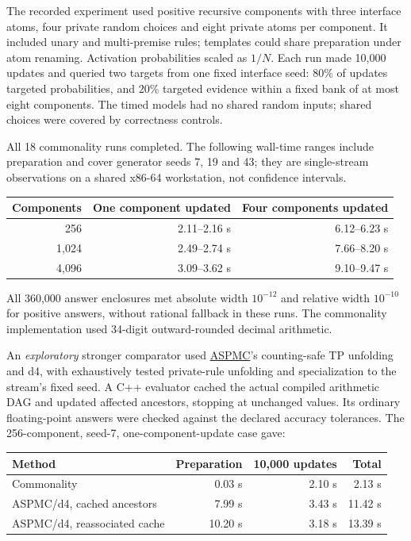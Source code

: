 \documentclass[11pt,a4paper]{article}
\begin{document}
The recorded experiment used positive recursive components with three interface
atoms, four private random choices and eight private atoms per component.
It included unary and multi-premise rules; templates could share preparation
under atom renaming. Activation probabilities scaled as $1/N$. Each run made
10,000 updates and queried two targets from one fixed interface seed: 80\% of
updates targeted probabilities, and 20\% targeted evidence within a fixed bank
of at most eight components. The timed models had no shared random inputs;
shared choices were covered by correctness controls.

All 18 commonality runs completed. The following wall-time ranges include
preparation and cover generator seeds 7, 19 and 43; they are single-stream
observations on a shared x86-64 workstation, not confidence intervals.

\begin{center}
\begin{tabular}{@{}rrr@{}}
\toprule
Components & One component updated & Four components updated \\
\midrule
256   & 2.11--2.16 s & 6.12--6.23 s \\
1,024 & 2.49--2.74 s & 7.66--8.20 s \\
4,096 & 3.09--3.62 s & 9.10--9.47 s \\
\bottomrule
\end{tabular}
\end{center}

All 360,000 answer enclosures met absolute width $10^{-12}$ and relative width
$10^{-10}$ for positive answers, without rational fallback in these runs.
The commonality implementation used 34-digit outward-rounded decimal arithmetic.

An \emph{exploratory} stronger comparator used
\href{https://proceedings.kr.org/2021/26/kr2021-0026-eiter-et-al.pdf}{ASPMC}'s
counting-safe TP unfolding and d4, with exhaustively tested private-rule unfolding and
specialization to the stream's fixed seed. A C++ evaluator cached the actual
compiled arithmetic DAG and updated affected ancestors, stopping at unchanged
values. Its ordinary floating-point answers were checked against the declared
accuracy tolerances. The 256-component, seed-7, one-component-update case gave:

\begin{center}
\begin{tabular}{@{}lrrr@{}}
\toprule
Method & Preparation & 10,000 updates & Total \\
\midrule
Commonality & 0.03 s & 2.10 s & 2.13 s \\
ASPMC/d4, cached ancestors & 7.99 s & 3.43 s & 11.42 s \\
ASPMC/d4, reassociated cache & 10.20 s & 3.18 s & 13.39 s \\
\bottomrule
\end{tabular}
\end{center}
\end{document}
